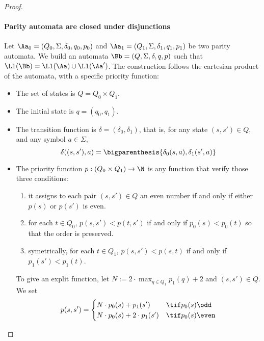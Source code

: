 \begin{proof}
    \paragraph{Parity automata are closed under disjunctions}
    Let $\Aa_0 = (Q_0, \Sigma, \delta_0, q_0, p_0)$
    and $\Aa_1 = (Q_1, \Sigma, \delta_1, q_1, p_1)$
    be two parity automata.
    We build an automata $\Bb = (Q, \Sigma, \delta, q, p)$
    such that $\Ll(\Bb) = \Ll(\Aa) \cup \Ll(\Aa')$.
    The construction follows the cartesian product of the automata,
    with a specific priority function: \begin{itemize}
        \item The set of states is $Q = Q_0 \times Q_1$.
        \item The initial state is $q = (q_0, q_1)$.
        \item The transition function is $\delta = (\delta_0,  \delta_1)$,
            that is, for any state $(s, s') \in Q$, and any symbol $a \in \Sigma$,
            \[
                \delta((s, s'), a) =
                    \bigparenthesis{
                        \delta_0(s, a),
                        \delta_1(s', a)
                    }
            \]
        \item The priority function $p: (Q_0 \times Q_1) \to \N$
            is any function that verify those three conditions:
            \begin{enumerate}
                \item it assigns to each pair $(s, s') \in Q$
                    an even number if and only if either $p(s)$ or $p(s')$ is even.
                \item for each $t \in Q_0$, $p(s, s') < p(t, s')$
                    if and only if $p_0(s) < p_0(t)$ so that the order is preserved.
                \item symetrically, for each $t \in Q_1$, $p(s, s') < p(s, t)$
                    if and only if $p_1(s') < p_1(t)$.
            \end{enumerate}
            To give an explit function, let $N := 2 \cdot \max_{q \in Q_1} p_1(q) + 2$ and $(s, s') \in Q$.
            We set
            \[
                p(s, s') = \begin{cases}
                    N \cdot p_0(s) + p_1(s') & \tif p_0(s) \odd \\
                    N \cdot p_0(s) + 2 \cdot p_1(s') & \tif p_0(s) \even
                \end{cases}
            \]
    \end{itemize}


\end{proof}
